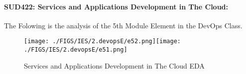 \documentclass[12pt]{extreport}
\begin{document}

\paragraph{\large SUD422: Services and Applications Development in The Cloud:\\
} 
The Folowing is the analysis of the 5th Module Element in the DevOps Class.
\begin{figure}[H]
	\centering
	\texttt{[image: ./FIGS/IES/2.devopsE/e52.png]}\texttt{[image: ./FIGS/IES/2.devopsE/e51.png]}
	\caption{Services and Applications Development in The Cloud EDA}
	\label{fig:25}
\end{figure}

\begin{comment}


\subparagraph{Interpretation of the Box-plots:}
The numbers Below and the boxplots above show that also in this element  TSI students performance is slightly better than PSI students and half of the MP Students.

\begin{comment}

\begin{enumerate}	
	\item The MP Class Box-Plot:
	\begin{enumerate}
		\item MAX = a {} {} {} {} {} {} {} {} UQ = b {} {} {} {} {} {} {} {} Median = c
		\item LQ = d {} {} {} {} {} {} {} {}  MIN =	l {} {} {} {} {} {} {} {}  IQR = e - f = g
	\end{enumerate}
	\item The PSI Class Box-Plot:
	\begin{enumerate}
		\item MAX = a {} {} {} {} {} {} {} {} UQ = b {} {} {} {} {} {} {} {} Median = c
		\item LQ = d {} {} {} {} {} {} {} {}  MIN =	e {} {} {} {} {} {} {} {} IQR = f - g = h	
	\end{enumerate}
	\item The TSI Class Box-Plot:
	\begin{enumerate}
		\item MAX = a {} {} {} {} {} {} {} {} UQ = b {} {} {} {} {} {} {} {} Median = c
		\item LQ = d {} {} {} {} {} {} {} {} MIN = e {} {} {} {} {} {} {} {} IQR = f - g = h	
	\end{enumerate}
\end{enumerate}



\subparagraph{Interpretation of the histogram:}
This Frequency Distribution is (Skeness) with the following descriptive statistics:

\begin{enumerate}
	\item Mean = 13.67
	\item STD = 1.97
	\item Range = 17.5 - 11 = 6.5
	\item IQR = 15 - 12 = 3 
\end{enumerate}
\end{comment}
\end{document}
